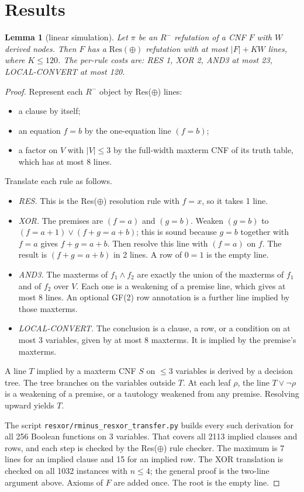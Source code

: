 \documentclass[11pt]{article}
\newtheorem{lemma}[theorem]{Lemma}
\begin{document}
\section{Results}
\begin{lemma}[linear simulation]\label{lem:sim}
Let $\pi$ be an $R^-$ refutation of a CNF $F$ with $W$ derived nodes. Then $F$ has a $\mathrm{Res}(\oplus)$ refutation with at most $|F|+K W$ lines, where $K\le 120$. The per-rule costs are: RES 1, XOR 2, AND3 at most 23, LOCAL-CONVERT at most 120.
\end{lemma}
\begin{proof}
Represent each $R^-$ object by Res($\oplus$) lines:
\begin{itemize}
\item a clause by itself;
\item an equation $f=b$ by the one-equation line $(f=b)$;
\item a factor on $V$ with $|V|\le3$ by the full-width maxterm CNF of its truth table, which has at most 8 lines.
\end{itemize}
Translate each rule as follows.
\begin{itemize}
\item \emph{RES.} This is the Res($\oplus$) resolution rule with $f=x$, so it takes 1 line.
\item \emph{XOR.} The premises are $(f=a)$ and $(g=b)$. Weaken $(g=b)$ to $(f=a{+}1)\vee(f{+}g=a{+}b)$; this is sound because $g=b$ together with $f=a$ gives $f+g=a+b$. Then resolve this line with $(f=a)$ on $f$. The result is $(f{+}g=a{+}b)$ in 2 lines. A row of $0=1$ is the empty line.
\item \emph{AND3.} The maxterms of $f_1\wedge f_2$ are exactly the union of the maxterms of $f_1$ and of $f_2$ over $V$. Each one is a weakening of a premise line, which gives at most 8 lines. An optional GF(2) row annotation is a further line implied by those maxterms.
\item \emph{LOCAL-CONVERT.} The conclusion is a clause, a row, or a condition on at most 3 variables, given by at most 8 maxterms. It is implied by the premise's maxterms.
\end{itemize}
A line $T$ implied by a maxterm CNF $S$ on $\le3$ variables is derived by a decision tree. The tree branches on the variables outside $T$. At each leaf $\rho$, the line $T\vee\neg\rho$ is a weakening of a premise, or a tautology weakened from any premise. Resolving upward yields $T$.

The script \texttt{resxor/rminus\_resxor\_transfer.py} builds every such derivation for all 256 Boolean functions on 3 variables. That covers all 2113 implied clauses and rows, and each step is checked by the Res($\oplus$) rule checker. The maximum is 7 lines for an implied clause and 15 for an implied row. The XOR translation is checked on all 1032 instances with $n\le4$; the general proof is the two-line argument above. Axioms of $F$ are added once. The root is the empty line.
\end{proof}
\end{document}
